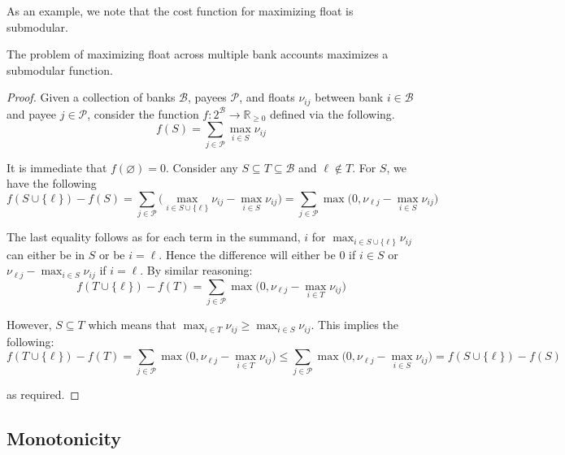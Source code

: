 \documentclass{article}
\begin{document}
As an example, we note that the cost function for maximizing float is submodular.

\begin{claim}\label{claim:float-submodular}
The problem of maximizing float across multiple bank accounts maximizes a submodular function.
\end{claim}
\begin{proof}
Given a collection of banks $\mathcal{B}$, payees $\mathcal{P}$, and floats $\nu_{ij}$ between bank $i \in \mathcal{B}$ and payee $j \in \mathcal{P}$, consider the function $f: 2^\mathcal{B} \rightarrow \mathbb{R}_{\geq 0}$ defined via the following.
\begin{equation*}
f(S) = \sum_{j \in \mathcal{P}} \max_{i \in S} \nu_{ij}
\end{equation*}

It is immediate that $f(\varnothing) = 0$. Consider any $S \subseteq T \subseteq \mathcal{B}$ and $\ell \notin T$. For $S$, we have the following
\begin{equation*}
f(S \cup \{ \ell \}) - f(S)
= \sum_{j \in \mathcal{P}} \bigg( \max_{i \in S \cup \{ \ell \}} \nu_{ij} - \max_{i \in S} \nu_{ij} \bigg)
= \sum_{j \in \mathcal{P}} \max \bigg( 0, \nu_{\ell j} - \max_{i \in S} \nu_{ij} \bigg)
\end{equation*}

The last equality follows as for each term in the summand, $i$ for $\max_{i \in S \cup \{ \ell \}} \nu_{ij}$ can either be in $S$ or be $i = \ell$. Hence the difference will either be $0$ if $i \in S$ or $\nu_{\ell j} - \max_{i \in S} \nu_{ij}$ if $i = \ell$. By similar reasoning:
\begin{equation*}
f(T \cup \{ \ell \}) - f(T)
= \sum_{j \in \mathcal{P}} \max \bigg( 0, \nu_{\ell j} - \max_{i \in T} \nu_{ij} \bigg)
\end{equation*}

However, $S \subseteq T$ which means that $\max_{i \in T} \nu_{ij} \geq \max_{i \in S} \nu_{ij}$. This implies the following:
\begin{equation*}
f(T \cup \{ \ell \}) - f(T)
= \sum_{j \in \mathcal{P}} \max \bigg( 0, \nu_{\ell j} - \max_{i \in T} \nu_{ij} \bigg)
\leq \sum_{j \in \mathcal{P}} \max \bigg( 0, \nu_{\ell j} - \max_{i \in S} \nu_{ij} \bigg)
= f(S \cup \{ \ell \}) - f(S)
\end{equation*}

as required.
\end{proof}

\subsection{Monotonicity}
\end{document}
